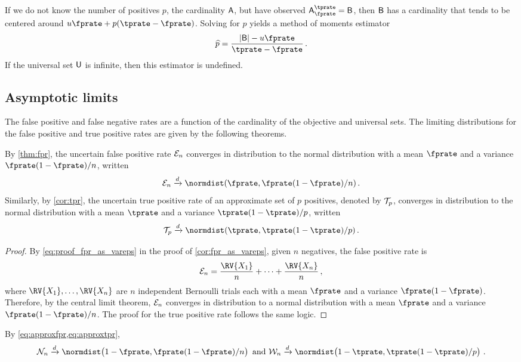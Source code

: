 \documentclass[ ../main.tex]{subfiles}
\begin{document}
If we do not know the number of positives $p$, the cardinality $\Set{A}$, but have observed $\ASet{A}[\fprate][\tprate] = \Set{B}$, then $\Set{B}$ has a cardinality that tends to be centered around $u \fprate + p (\tprate - \fprate)$.
Solving for $p$ yields a method of moments estimator
\begin{equation}
	\widehat{p} = \frac{\Card{\Set{B}} - u \fprate}{\tprate - \fprate}\,.
\end{equation}
If the universal set $\Set{U}$ is infinite, then this estimator is undefined.

\subsection{Asymptotic limits}
\label{sec:asymtotic}
The false positive and false negative rates are a function of the cardinality of the objective and universal sets.
The limiting distributions for the false positive and true positive rates are given by the following theorems.
\begin{theorem}
    \label{thm:approxfpr}
    By \cref{thm:fpr}, the uncertain false positive rate $\mathcal{E}_n$ converges in
    distribution to the normal distribution with a mean $\fprate$ and a 
    variance $\fprate(1-\fprate)/n$, written
    \begin{equation}
    \label{eq:approxfpr}
	    \FPR_n \xrightarrow{d} \normdist(\fprate, \fprate(1-\fprate) / n)\,.
    \end{equation}
    Similarly, by \cref{cor:tpr}, the uncertain true positive rate of an approximate  set of $p$ positives, denoted by $\mathcal{T}_p$, converges in distribution to the normal distribution with a mean $\tprate$ and a variance $\tprate(1-\tprate)/p$, written
    \begin{equation}
    \label{eq:approxtpr}
    	\TPR_p \xrightarrow{d} \normdist(\tprate, \tprate(1-\tprate) / p)\,.
    \end{equation}
\end{theorem}
\begin{proof}
    By \cref{eq:proof_fpr_as_vareps} in the proof of \cref{cor:fpr_as_vareps}, 
    given 
    $n$ negatives, the false positive rate is
    \begin{equation}
    	\FPR_n = \frac{\RV{X_1}}{n} + \cdots + \frac{\RV{X_n}}{n}\,,
    \end{equation}
    where $\RV{X_1},\ldots,\RV{X_n}$ are $n$ independent Bernoulli trials each with a mean $\fprate$ and a variance $\fprate(1-\fprate)$.
    Therefore, by the central limit theorem, $\mathcal{E}_n$ converges in distribution to a normal distribution with a mean $\fprate$  and a variance $\fprate(1-\fprate)/n$.
    The proof for the true positive rate follows the same logic.
\end{proof}
By \cref{eq:approxfpr,eq:approxtpr},
\begin{equation}
	\TNR_n \xrightarrow{d} \normdist\!\left(1-\fprate, \fprate(1-\fprate) / n\right) \text{ and } \FNR_n \xrightarrow{d} \normdist\!\left(1-\tprate, \tprate(1-\tprate) / p\right)\,.	
\end{equation}
\end{document}
